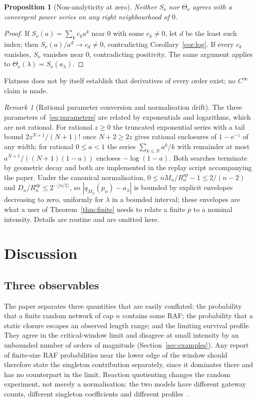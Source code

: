 \documentclass[11pt,a4paper]{article}
\theoremstyle{plain}
\newtheorem{proposition}[theorem]{Proposition}
\theoremstyle{definition}
\theoremstyle{remark}
\newtheorem{remark}[theorem]{Remark}
\newcommand{\conventional}{\par\nopagebreak{\small\raggedright\textup{Conventional proof; not formalised.}\par}}
\newcommand{\spc}{\mathrm{sp}}
\newcommand{\ee}{\mathrm{e}}
\begin{document}
\begin{proposition}[Non-analyticity at zero]\label{prop:analytic}
Neither $S_\nu$ nor $\Theta_\nu$ agrees with a convergent power series on any right neighbourhood of $0$.
\end{proposition}
\begin{proof}
If $S_\nu(a)=\sum_kc_ka^k$ near $0$ with some $c_k\ne0$, let $d$ be the least such index; then $S_\nu(a)/a^d\to c_d\ne0$, contradicting Corollary~\ref{cor:log}. If every $c_k$ vanishes, $S_\nu$ vanishes near $0$, contradicting positivity. The same argument applies to $\Theta_\nu(\lambda)=S_\nu(a_\lambda)$.
\end{proof}
\conventional
Flatness does not by itself establish that derivatives of every order exist; no $C^\infty$ claim is made.

\begin{remark}[Rational parameter conversion and normalisation drift]\label{rem:conversion}
The three parameters of~\eqref{eq:parameters} are related by exponentials and logarithms, which are not rational. For rational $z\ge0$ the truncated exponential series with a tail bound $2z^{N+1}/(N+1)!$ once $N+2\ge2z$ gives rational enclosures of $1-\ee^{-z}$ of any width; for rational $0\le a<1$ the series $\sum_{k\le N}a^k/k$ with remainder at most $a^{N+1}/((N+1)(1-a))$ encloses $-\log(1-a)$. Both searches terminate by geometric decay and both are implemented in the replay script accompanying the paper. Under the canonical normalisation, $0\le nM_n/R_n^{\spc}-1\le2/(n-2)$ and $D_n/R_n^{\spc}\le2^{-\lfloor n/2\rfloor}$, so $|q_{M_n}(p_n)-a_\lambda|$ is bounded by explicit envelopes decreasing to zero, uniformly for $\lambda$ in a bounded interval; these envelopes are what a user of Theorem~\ref{thm:finite} needs to relate a finite $p$ to a nominal intensity. Details are routine and are omitted here.
\end{remark}

\section{Discussion}\label{sec:discussion}

\subsection*{Three observables}
The paper separates three quantities that are easily conflated: the probability that a finite random network of cap $n$ contains some RAF; the probability that a static closure escapes an observed length range; and the limiting survival profile. They agree in the critical-window limit and disagree at small intensity by an unbounded number of orders of magnitude (Section~\ref{sec:examples}). Any report of finite-size RAF probabilities near the lower edge of the window should therefore state the singleton contribution separately, since it dominates there and has no counterpart in the limit. Reaction quotienting changes the random experiment, not merely a normalisation: the two models have different gateway counts, different singleton coefficients and different profiles~\cite{quotientwindow2026}.
\end{document}
